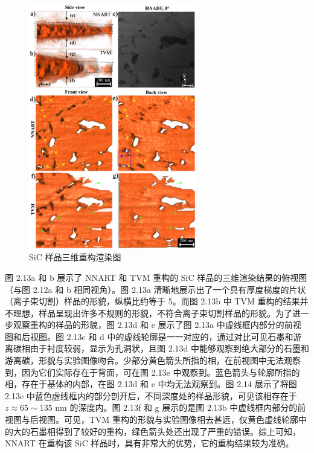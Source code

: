 \begin{figure}[H]
	\vspace{\baselineskip}
	\centering
	\includegraphics[width=0.65\textwidth]{../3.16/316}
	\caption{SiC 样品三维重构渲染图}\label{fig:310}
	\song{}
\end{figure}

图 2.13a 和 b 展示了 NNART 和 TVM 重构的 SiC 样品的三维渲染结果的俯视图（与图 2.12a 和 b 相同视角）。图 2.13a 清晰地展示出了一个具有厚度梯度的片状（离子束切割）样品的形貌，纵横比约等于 5。而图 2.13b 中 TVM 重构的结果并不理想，样品呈现出许多不规则的形貌，不符合离子束切割样品的形貌。为了进一步观察重构的样品的形貌，图 2.13d 和 e 展示了图 2.13a 中虚线框内部分的前视图和后视图。图 2.13c 和 d 中的虚线轮廓是一一对应的，通过对比可见石墨和游离碳相由于衬度较弱，显示为孔洞状，且图 2.13d 中能够观察到绝大部分的石墨和游离碳，形貌与实验图像吻合。少部分黄色箭头所指的相，在前视图中无法观察到，因为它们实际存在于背面，可在图 2.13e 中观察到。蓝色箭头与轮廓所指的相，存在于基体的内部，在图 2.13d 和 e 中均无法观察到。图 2.14 展示了将图 2.13e 中蓝色虚线框内的部分剖开后，不同深度处的样品形貌，可见该相存在于 $z \approx 65 \sim 135$ nm 的深度内。图 2.13f 和 g 展示的是图 2.13b 中虚线框内部分的前视图与后视图。可见，TVM 重构的形貌与实验图像相去甚远，仅黄色虚线轮廓中的大的石墨相得到了较好的重构，绿色箭头处还出现了严重的错误。综上可知，NNART 在重构该 SiC 样品时，具有非常大的优势，它的重构结果较为准确。







